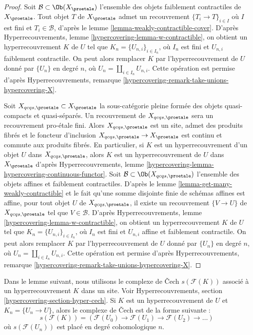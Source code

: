 \begin{proof}
Soit $\mathcal{B} \subset \Ob(X_\proetale)$ l'ensemble des objets faiblement contractiles
de $X_\proetale$. Tout objet $T$ de $X_\proetale$ admet un
recouvrement $\{T_i \to T\}_{i \in I}$ où $I$ est fini et $T_i \in \mathcal{B}$, d'après le
lemme \ref{lemma-weakly-contractible-cover}.
D'après Hyperrecouvrements, lemme \ref{hypercovering-lemma-w-contractible},
on obtient un hyperrecouvrement $K$ de $U$ tel que $K_n = \{U_{n, i}\}_{i \in I_n}$,
où $I_n$ est fini et $U_{n, i}$ faiblement contractile.
On peut alors remplacer $K$ par l'hyperrecouvrement de $U$ donné par $\{U_n\}$
en degré $n$, où $U_n = \coprod_{i \in I_n} U_{n, i}$.
Cette opération est permise d'après Hyperrecouvrements,
remarque \ref{hypercovering-remark-take-unions-hypercovering-X}.

\medskip\noindent
Soit $X_{qcqs, \proetale} \subset X_\proetale$ la sous-catégorie pleine
formée des objets quasi-compacts et quasi-séparés.
Un recouvrement de $X_{qcqs, \proetale}$ sera un recouvrement pro-\'etale fini.
Alors $X_{qcqs, \proetale}$ est un site, admet des produits fibrés et
le foncteur d'inclusion $X_{qcqs, \proetale} \to X_\proetale$ est continu
et commute aux produits fibrés.
En particulier, si $K$ est un hyperrecouvrement d'un objet $U$ dans
$X_{qcqs, \proetale}$, alors $K$ est un hyperrecouvrement de $U$ dans $X_\proetale$
d'après Hyperrecouvrements, lemme
\ref{hypercovering-lemma-hypercovering-continuous-functor}.
Soit $\mathcal{B} \subset \Ob(X_{qcqs, \proetale})$ l'ensemble des objets
affines et faiblement contractiles. D'après le
lemme \ref{lemma-get-many-weakly-contractible}
et le fait qu'une somme disjointe finie de schémas affines est affine,
pour tout objet $U$ de $X_{qcqs, \proetale}$, il existe un recouvrement
$\{V \to U\}$ de $X_{qcqs, \proetale}$ tel que $V \in \mathcal{B}$.
D'après Hyperrecouvrements, lemme \ref{hypercovering-lemma-w-contractible},
on obtient un hyperrecouvrement $K$ de $U$ tel que $K_n = \{U_{n, i}\}_{i \in I_n}$,
où $I_n$ est fini et $U_{n, i}$ affine et faiblement contractile.
On peut alors remplacer $K$ par l'hyperrecouvrement de $U$
donné par $\{U_n\}$ en degré $n$, où
$U_n = \coprod_{i \in I_n} U_{n, i}$. Cette opération est permise d'après
Hyperrecouvrements, remarque \ref{hypercovering-remark-take-unions-hypercovering-X}.
\end{proof}

\noindent
Dans le lemme suivant, nous utilisons le complexe de {\v C}ech $s(\mathcal{F}(K))$
associé à un hyperrecouvrement $K$ dans un site. Voir
Hyperrecouvrements, section \ref{hypercovering-section-hyper-cech}.
Si $K$ est un hyperrecouvrement de $U$ et $K_n = \{U_n \to U\}$, alors
le complexe de {\v C}ech est de la forme suivante :
$$
s(\mathcal{F}(K)) =
\left(
\mathcal{F}(U_0) \to \mathcal{F}(U_1) \to \mathcal{F}(U_2) \to \ldots
\right)
$$
où $s(\mathcal{F}(U_n))$ est placé en degré cohomologique $n$.


